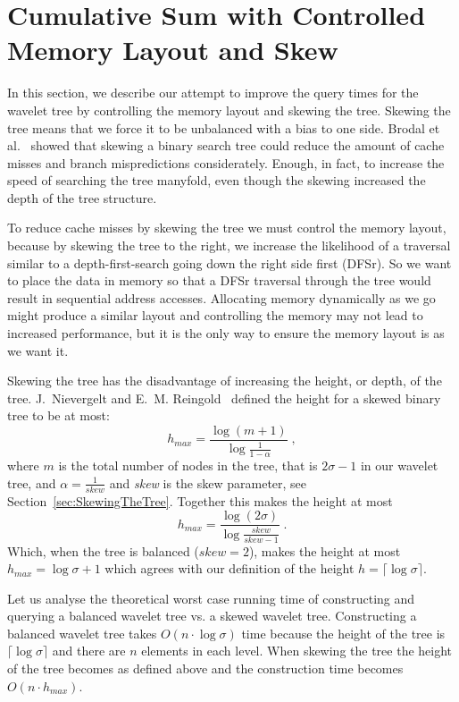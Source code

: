 \section{Cumulative Sum with Controlled Memory Layout and Skew}
\label{sec:memorylayout}
In this section, we describe our attempt to improve the query times for the wavelet tree by controlling the memory layout and skewing the tree.
Skewing the tree means that we force it to be unbalanced with a bias to one side. 
Brodal et al.~ showed that skewing a binary search tree could reduce the amount of cache misses and branch mispredictions considerately. Enough, in fact, to increase the speed of searching the tree manyfold, even though the skewing increased the depth of the tree structure.

To reduce cache misses by skewing the tree we must control the memory layout, because by skewing the tree to the right, we increase the likelihood of a traversal similar to a depth-first-search going down the right side first (DFSr). So we want to place the data in memory so that a DFSr traversal through the tree would result in sequential address accesses.
Allocating memory dynamically as we go might produce a similar layout and controlling the memory may not lead to increased performance, but it is the only way to ensure the memory layout is as we want it.

Skewing the tree has the disadvantage of increasing the height, or depth, of the tree.
J.~Nievergelt and E.~M. Reingold~ defined the height for a skewed binary tree to be at most:
\[ h_{max} = \frac{\log(m+1)}{ \log\frac{1}{1-\alpha}} \;,\]
where $m$ is the total number of nodes in the tree, that is $2 \sigma - 1$ in our wavelet tree, and $\alpha = \frac{1}{\mathit{skew}}$ and \textit{skew} is the skew parameter, see Section~\ref{sec:SkewingTheTree}.
Together this makes the height at most
\[ h_{max} = \frac{\log(2 \sigma)}{ \log\frac{\mathit{skew}}{\mathit{skew} - 1}}  \;.\]
Which, when the tree is balanced ($\mathit{skew} = 2$), makes the height at most $h_{max} = \log \sigma + 1$ which agrees with our definition of the height $h = \lceil \log \sigma \rceil$.

Let us analyse the theoretical worst case running time of constructing and querying a balanced wavelet tree vs. a skewed wavelet tree.
Constructing a balanced wavelet tree takes  $O(n \cdot \log \sigma)$ time because the height of the tree is $\lceil \log \sigma \rceil$ and there are $n$ elements in each level.
When skewing the tree the height of the tree becomes as defined above and the construction time becomes $O(n \cdot h_{max})$.

